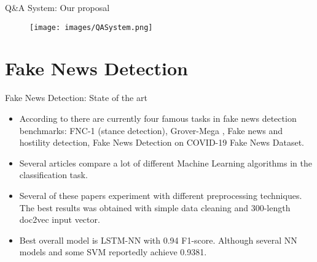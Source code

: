 \documentclass[aspectratio=169]{beamer}
\begin{document}
\begin{frame}{Q\&A System: Our proposal}

\begin{figure}
    \centering
    \texttt{[image: images/QASystem.png]}
\end{figure}

\end{frame}



\section{Fake News Detection}
\begin{frame}{Fake News Detection: State of the art}
    \begin{itemize}
        \item According to \cite{PapersWithCodeBenchmark} there are currently four famous tasks in fake news detection benchmarks: FNC-1 (stance detection), Grover-Mega \cite{grover}, Fake news and hostility detection, Fake News Detection on COVID-19 Fake News Dataset.
        
        \item Several articles \cite{List2, List1, Constraint, List3, List4, FightingInfodemic} compare a lot of different Machine Learning algorithms in the classification task.
        
        \item Several of these papers experiment with different preprocessing techniques. The best results was obtained with simple data cleaning and 300-length doc2vec input vector.
        
        \item Best overall model is LSTM-NN with 0.94 F1-score. Although several NN models and some SVM reportedly achieve 0.9381.
    \end{itemize}
\end{frame}
\end{document}
